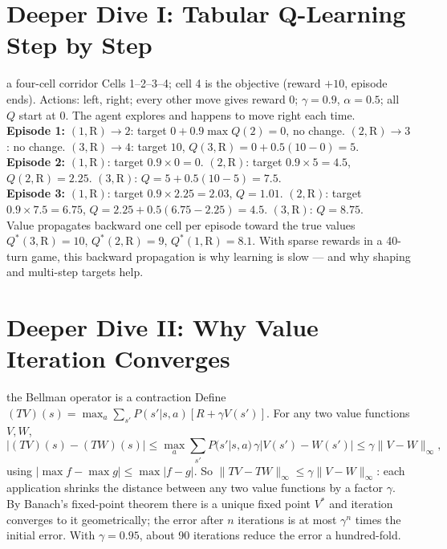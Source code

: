 \documentclass[11pt]{article}
\begin{document}
\section{Deeper Dive I: Tabular Q-Learning Step by Step}
\begin{example}{a four-cell corridor}
Cells 1--2--3--4; cell 4 is the objective (reward $+10$, episode ends). Actions: left, right; every other move gives reward 0; $\gamma=0.9$, $\alpha=0.5$; all $Q$ start at 0. The agent explores and happens to move right each time.\\
\textbf{Episode 1:} $(1,\text{R})\to2$: target $0+0.9\max Q(2)=0$, no change. $(2,\text{R})\to3$: no change. $(3,\text{R})\to4$: target $10$, $Q(3,\text{R})=0+0.5(10-0)=5$.\\
\textbf{Episode 2:} $(1,\text{R})$: target $0.9\times0=0$. $(2,\text{R})$: target $0.9\times5=4.5$, $Q(2,\text{R})=2.25$. $(3,\text{R})$: $Q=5+0.5(10-5)=7.5$.\\
\textbf{Episode 3:} $(1,\text{R})$: target $0.9\times2.25=2.03$, $Q=1.01$. $(2,\text{R})$: target $0.9\times7.5=6.75$, $Q=2.25+0.5(6.75-2.25)=4.5$. $(3,\text{R})$: $Q=8.75$.\\
Value propagates backward one cell per episode toward the true values $Q^*(3,\text{R})=10$, $Q^*(2,\text{R})=9$, $Q^*(1,\text{R})=8.1$. With sparse rewards in a 40-turn game, this backward propagation is why learning is slow --- and why shaping and multi-step targets help.
\end{example}

\section{Deeper Dive II: Why Value Iteration Converges}
\begin{derivation}{the Bellman operator is a contraction}
Define $(TV)(s)=\max_a\sum_{s'}P(s'|s,a)[R+\gamma V(s')]$. For any two value functions $V,W$,
\[|(TV)(s)-(TW)(s)|\le\max_a\sum_{s'}P(s'|s,a)\,\gamma|V(s')-W(s')|\le\gamma\|V-W\|_\infty,\]
using $|\max f-\max g|\le\max|f-g|$. So $\|TV-TW\|_\infty\le\gamma\|V-W\|_\infty$: each application shrinks the distance between any two value functions by a factor $\gamma$. By Banach's fixed-point theorem there is a unique fixed point $V^*$ and iteration converges to it geometrically; the error after $n$ iterations is at most $\gamma^n$ times the initial error. With $\gamma=0.95$, about 90 iterations reduce the error a hundred-fold.
\end{derivation}
\end{document}
